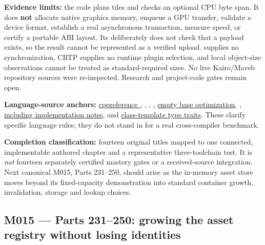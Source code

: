\textbf{Evidence limits:} the code plans tiles and checks an optional CPU byte span. It does \textbf{not} allocate native graphics memory, enqueue a GPU transfer, validate a device format, establish a real asynchronous transaction, measure speed, or certify a portable ABI layout. Its  deliberately does not check that a payload exists, so the result cannot be represented as a verified upload.  supplies no synchronization, CRTP supplies no runtime plugin selection, and local object-size observations cannot be treated as standard-required sizes. No live Kairo/Maveb repository sources were re-inspected. Research and project-code gates remain open.

\textbf{Language-source anchors:} \href{https://en.cppreference.com/w/cpp/language/if}{cppreference }, \href{https://en.cppreference.com/w/cpp/language/constexpr}{}, \href{https://en.cppreference.com/w/cpp/language/consteval}{}, \href{https://en.cppreference.com/w/cpp/language/constinit}{}, \href{https://en.cppreference.com/w/cpp/language/ebo}{empty base optimization}, \href{https://en.cppreference.com/w/cpp/language/attributes/no_unique_address}{, including implementation notes}, and \href{https://en.cppreference.com/w/cpp/types}{class-template type traits}. These clarify specific language rules; they do not stand in for a real cross-compiler benchmark.

\textbf{Completion classification:} fourteen original titles mapped to one connected, implementable authored chapter and a representative three-toolchain test. It is \emph{not} fourteen separately certified mastery gates or a received-source integration. Next canonical M015, Parts 231--250, should arise as the in-memory asset store moves beyond its fixed-capacity demonstration into standard container growth, invalidation, storage and lookup choices.

\subsection{M015 --- Parts 231--250: growing the asset registry without losing identities}\label{appendix-fd090d982a15-m015-parts-231250-growing-the-asset-registry-without-losing-identities}

\hypertarget{appendix-fd090d982a15-m015-parts-231250-growing-the-asset-registry-without-losing-identities}{}


